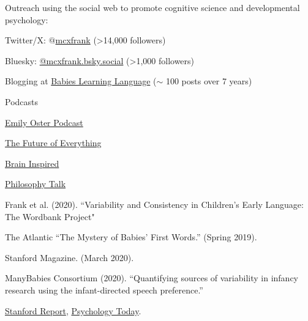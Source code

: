 \documentclass{article}
\renewenvironment{itemize}{
\begin{list}{}{
  \setlength{\leftmargin}{1.5em}
  }
  }{
\end{list}
}
\begin{document}
\begin{itemize}
\item Outreach using the social web to promote cognitive science and developmental psychology:
\begin{itemize}
  \item Twitter/X: \href{http://twitter.com/mcxfrank}{$@$mcxfrank} (>14,000 followers)
  \item Bluesky: \href{https://bsky.app/profile/mcxfrank.bsky.social}{@mcxfrank.bsky.social} (>1,000 followers)
  \item Blogging at \href{http://babieslearninglanguage.blogspot.com}{Babies Learning Language} ($\sim$ 100 posts over 7 years)
\end{itemize}

\begin{itemize}
\item Podcasts
\begin{itemize}
  \item \href{https://parentdata.org/learning-to-speak/}{Emily Oster Podcast}
  \item \href{https://engineering.stanford.edu/magazine/future-language-learning}{The Future of Everything}
  \item \href{https://braininspired.co/podcast/171/}{Brain Inspired}
  \item \href{https://www.philosophytalk.org/shows/can-ai-help-us-understand-babies}{Philosophy Talk}
\end{itemize}


  \item Frank et al. (2020). ``Variability and Consistency in Children's Early Language: The Wordbank Project"
  \begin{itemize}
    \item The Atlantic ``The Mystery of Babies’ First Words.'' (Spring 2019).
    \item Stanford Magazine. (March 2020).
  \end{itemize}

  \item ManyBabies Consortium (2020). ``Quantifying sources of variability in infancy research using the infant-directed speech preference.''
  \begin{itemize}
    \item \href{https://news.stanford.edu/2020/03/16/babies-love-baby-talk-world/}{Stanford Report}, \href{https://www.psychologytoday.com/us/blog/the-athletes-way/202004/baby-talk-is-universal-language}{Psychology Today}.
  \end{itemize}



\end{itemize}
\end{itemize}
\end{document}
